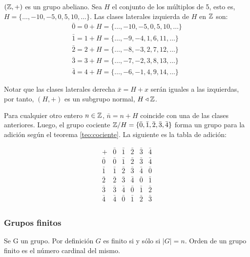 \begin{fmd-example} \label{ex:cociente}
	$(\mathbb{Z}, +)$ es un grupo abeliano. Sea $H$ el conjunto de los múltiplos de 5, esto es, $H = \{ \dots, -10, -5, 0, 5, 10, \dots \}$. Las clases laterales izquierda de $H$ en $\mathbb{Z}$ son:
	\[ \begin{array}{l}
		\bar{0} = 0 + H = \{ \dots, -10, -5, 0, 5, 10, \dots \}\\
		\bar{1} = 1 + H = \{ \dots, -9, -4, 1, 6, 11, \dots \}\\
		\bar{2} = 2 + H = \{ \dots, -8, -3, 2, 7, 12, \dots \}\\
		\bar{3} = 3 + H = \{ \dots, -7, -2, 3, 8, 13, \dots \}\\
		\bar{4} = 4 + H = \{ \dots, -6, -1, 4, 9, 14, \dots \}
	\end{array} \]
	
	Notar que las clases laterales derecha $\bar{x} = H + x$ serán iguales a las izquierdas, por tanto, $(H, +)$ es un subgrupo normal, $H \triangleleft \mathbb{Z}$.
	
	Para cualquier otro entero $n \in \mathbb{Z}$, $\bar{n} = n + H$ coincide con una de las clases anteriores. Luego, el grupo cociente $\mathbb{Z} / H = \{ \bar{0}, \bar{1}, \bar{2}, \bar{3}, \bar{4} \}$ forma un grupo para la adición según el teorema \ref{teo:cociente}. La siguiente es la tabla de adición:
	\begin{table}[H]
		\centering
		\[
		\begin{array}{c|ccccc}
			+ & \bar{0} & \bar{1} & \bar{2} & \bar{3} & \bar{4}\\ \hline
			\bar{0} & \bar{0} & \bar{1} & \bar{2} & \bar{3} & \bar{4}\\
			\bar{1} & \bar{1} & \bar{2} & \bar{3} & \bar{4} & \bar{0}\\
			\bar{2} & \bar{2} & \bar{3} & \bar{4} & \bar{0} & \bar{1}\\
			\bar{3} & \bar{3} & \bar{4} & \bar{0} & \bar{1} & \bar{2}\\
			\bar{4} & \bar{4} & \bar{0} & \bar{1} & \bar{2} & \bar{3}\\
		\end{array}
		\]
	\end{table}
\end{fmd-example}

\subsubsection{Grupos finitos}

Se G un grupo. Por definición $G$ es finito si y sólo si $|G| = n$. Orden de un grupo finito es el número cardinal del mismo.

